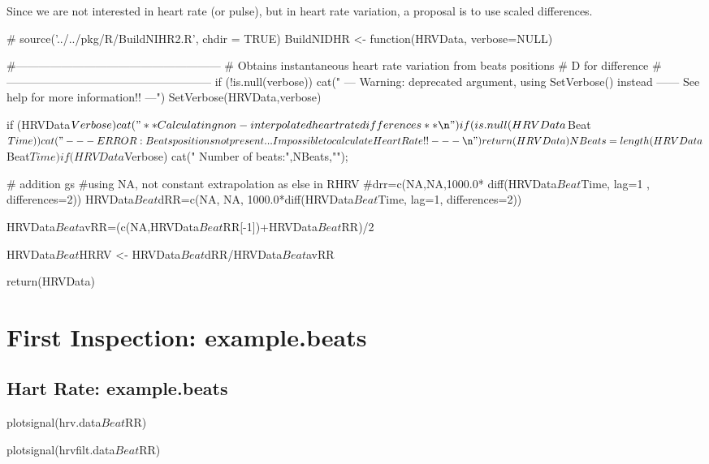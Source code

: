 \documentclass[a4paper, english, utf8]{amsart}
\begin{document}
Since we are not interested in heart rate (or pulse), but in heart rate variation, a proposal is to use scaled differences.

\begin{Schunk}
\begin{Sinput}
  # source('../../pkg/R/BuildNIHR2.R', chdir = TRUE)
  BuildNIDHR <-
  function(HRVData, verbose=NULL) {
  #------------------------------------------------------ 
  # Obtains instantaneous heart rate variation from beats positions
  # D for difference
  #------------------------------------------------------ 
  	if (!is.null(verbose)) {
  		cat("  --- Warning: deprecated argument, using SetVerbose() instead ---\n    --- See help for more information!! ---\n")
  		SetVerbose(HRVData,verbose)
  	}
  	
  	if (HRVData$Verbose) {
  		cat("** Calculating non-interpolated heart rate differences **\n")
  	}
  
  	if (is.null(HRVData$Beat$Time)) {
  		cat("   --- ERROR: Beats positions not present... Impossible to calculate Heart Rate!! ---\n")
  		return(HRVData)
  	}
  	
  	NBeats=length(HRVData$Beat$Time)
  	if (HRVData$Verbose) {
  		cat("   Number of beats:",NBeats,"\n");
  	}
  	
    # addition gs 
     #using NA, not constant extrapolation as else in RHRV  
     #drr=c(NA,NA,1000.0*	diff(HRVData$Beat$Time, lag=1 , differences=2))
     HRVData$Beat$dRR=c(NA, NA, 
     	1000.0*diff(HRVData$Beat$Time, lag=1, differences=2))
  
     HRVData$Beat$avRR=(c(NA,HRVData$Beat$RR[-1])+HRVData$Beat$RR)/2
     
     HRVData$Beat$HRRV <- HRVData$Beat$dRR/HRVData$Beat$avRR
  
  	return(HRVData)
  }
  
  
\end{Sinput}
\end{Schunk}
\clearpage
\section{First Inspection: example.beats}

\subsection{Hart Rate: example.beats}

\begin{Schunk}
\begin{Sinput}
  plotsignal(hrv.data$Beat$RR)
\end{Sinput}
\end{Schunk}
\begin{Schunk}
\begin{Sinput}
  plotsignal(hrvfilt.data$Beat$RR)
\end{Sinput}
\end{Schunk}
\end{document}
